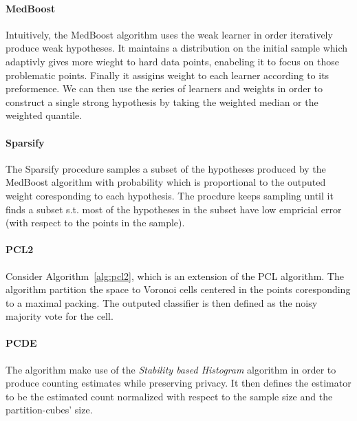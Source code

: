 \paragraph{MedBoost}
Intuitively, the MedBoost algorithm uses the weak learner in order iteratively produce weak hypotheses. It maintains a distribution on the initial sample which adaptivly gives more wieght to hard data points, enabeling it to focus on those problematic points. Finally it assigins weight to each learner according to its preformence. We can then use the series of learners and weights in order to construct a single strong hypothesis by taking the weighted median or the weighted quantile. 

\paragraph{Sparsify}
The Sparsify procedure samples a subset of the hypotheses produced by the MedBoost algorithm with probability which is proportional to the outputed weight coresponding to each hypothesis.
The procdure keeps sampling until it finds a subset s.t. most of the hypotheses in the subset have low empricial error (with respect to the points in the sample).

\paragraph{PCL2}
Consider Algorithm~\ref{alg:pcl2}, which is an extension of the PCL algorithm.
The algorithm partition the space to Voronoi cells centered in the points coresponding to a maximal packing. The outputed classifier is then defined as the noisy majority vote for the cell. 

\paragraph{PCDE}
The algorithm make use of the \emph{Stability based Histogram} algorithm in order to produce counting estimates while preserving privacy.
It then defines the estimator to be the estimated count normalized with respect to the sample size and the partition-cubes' size.
